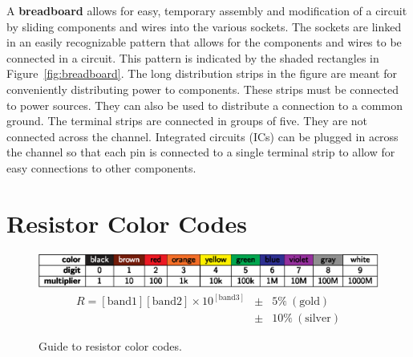 \documentclass[11pt]{article}
\begin{document}
A \textbf{breadboard} allows for easy, temporary assembly and
modification of a circuit by sliding components and wires into the
various sockets. The sockets are linked in an easily recognizable
pattern that allows for the components and wires to be connected in a
circuit. This pattern is indicated by the shaded rectangles in
Figure~\ref{fig:breadboard}.  The long distribution strips in the
figure are meant for conveniently distributing power to
components. These strips must be connected to power sources. They can
also be used to distribute a connection to a common ground.  The
terminal strips are connected in groups of five. They are not
connected across the channel. Integrated circuits (ICs) can be plugged
in across the channel so that each pin is connected to a single
terminal strip to allow for easy connections to other components.

\section{Resistor Color Codes}

\begin{figure}[ht]
  \begin{center}
    \includegraphics{resistor_color_codes.eps}
    \begin{eqnarray*}
      R = [\mathrm{band 1}][\mathrm{band 2}] 
      \times 10^{[\mathrm{band 3}]} & \pm & 5\%~(\mathrm{gold})\\ 
      & \pm & 10\%~(\mathrm{silver})\nonumber
    \end{eqnarray*}
    \caption{\label{fig:rcolorcodes} Guide to resistor color codes.}
  \end{center}
\end{figure}
\end{document}
